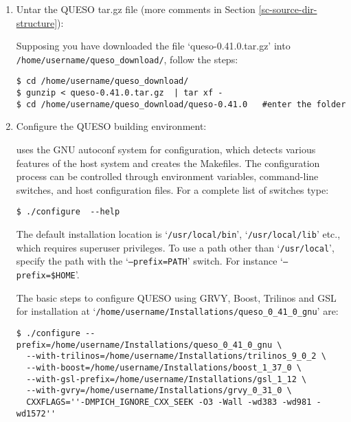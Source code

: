 \begin{enumerate}
\item {Untar the QUESO tar.gz file (more comments in Section \ref{sc-source-dir-structure}): %

Supposing you have downloaded the file `queso-0.41.0.tar.gz' into \texttt{/home/username/queso\_download/}, follow the steps:

\begin{verbatim}
$ cd /home/username/queso_download/
$ gunzip < queso-0.41.0.tar.gz  | tar xf -
$ cd /home/username/queso_download/queso-0.41.0   #enter the folder 
\end{verbatim}
}


\item {Configure the QUESO building environment: %

\Queso{} uses the GNU autoconf system for configuration, which detects various features of the host system and creates the Makefiles. %
%  
% 
The configuration process can be controlled through environment variables, command-line switches, and host configuration files.
For a complete list of switches type:
\begin{verbatim}
$ ./configure  --help       
\end{verbatim}
%
 The default installation location is `\texttt{/usr/local/bin}', `\texttt{/usr/local/lib}' etc., which requires superuser privileges. To use a path
        other than `\texttt{/usr/local}', specify the path with the `\texttt{--prefix=PATH}' switch. For instance `\texttt{--prefix=\$HOME}'.



The basic steps to configure QUESO using GRVY, Boost, Trilinos and GSL for installation at `\texttt{/home/username/Installations/queso\_0\_41\_0\_gnu}' are:
\begin{verbatim}
$ ./configure --prefix=/home/username/Installations/queso_0_41_0_gnu \
  --with-trilinos=/home/username/Installations/trilinos_9_0_2 \
  --with-boost=/home/username/Installations/boost_1_37_0 \
  --with-gsl-prefix=/home/username/Installations/gsl_1_12 \
  --with-gvry=/home/username/Installations/grvy_0_31_0 \
  CXXFLAGS=''-DMPICH_IGNORE_CXX_SEEK -O3 -Wall -wd383 -wd981 -wd1572''
\end{verbatim}

}
\end{enumerate}
